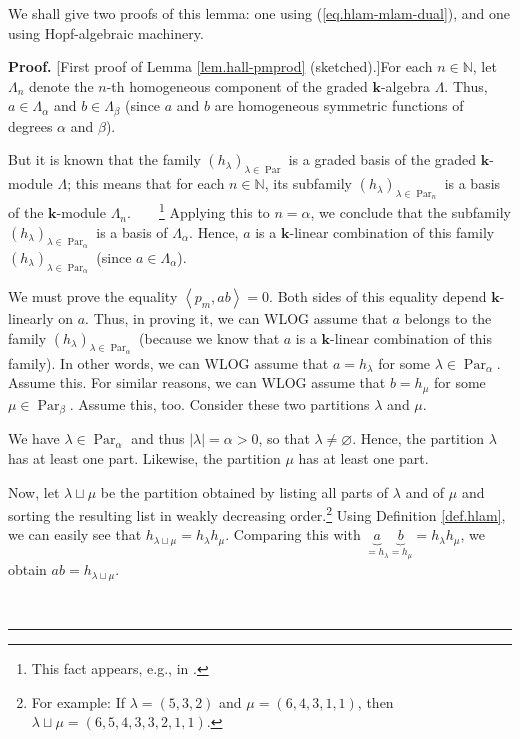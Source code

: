 \documentclass[numbers=enddot,12pt,final,onecolumn,notitlepage]{scrartcl}%
\theoremstyle{definition}
\newenvironment{proof}[1][Proof]{\noindent\textbf{#1.} }{\ \rule{0.5em}{0.5em}}
\newenvironment{verlong}{}{}
\begin{document}
\begin{verlong}
We shall give two proofs of this lemma: one using (\ref{eq.hlam-mlam-dual}),
and one using Hopf-algebraic machinery.

\begin{proof}
[First proof of Lemma \ref{lem.hall-pmprod} (sketched).]For each
$n\in\mathbb{N}$, let $\Lambda_{n}$ denote the $n$-th homogeneous component of
the graded $\mathbf{k}$-algebra $\Lambda$. Thus, $a\in\Lambda_{\alpha}$ and
$b\in\Lambda_{\beta}$ (since $a$ and $b$ are homogeneous symmetric functions
of degrees $\alpha$ and $\beta$).

But it is known that the family $\left(  h_{\lambda}\right)  _{\lambda
\in\operatorname*{Par}}$ is a graded basis of the graded $\mathbf{k}$-module
$\Lambda$; this means that for each $n\in\mathbb{N}$, its subfamily $\left(
h_{\lambda}\right)  _{\lambda\in\operatorname*{Par}\nolimits_{n}}$ is a basis
of the $\mathbf{k}$-module $\Lambda_{n}$.\ \ \ \ \footnote{This fact appears,
e.g., in \cite[Proposition 2.4.3(j)]{GriRei}.} Applying this to $n=\alpha$, we
conclude that the subfamily $\left(  h_{\lambda}\right)  _{\lambda
\in\operatorname*{Par}\nolimits_{\alpha}}$ is a basis of $\Lambda_{\alpha}$.
Hence, $a$ is a $\mathbf{k}$-linear combination of this family $\left(
h_{\lambda}\right)  _{\lambda\in\operatorname*{Par}\nolimits_{\alpha}}$ (since
$a\in\Lambda_{\alpha}$).

We must prove the equality $\left\langle p_{m},ab\right\rangle =0$. Both sides
of this equality depend $\mathbf{k}$-linearly on $a$. Thus, in proving it, we
can WLOG assume that $a$ belongs to the family $\left(  h_{\lambda}\right)
_{\lambda\in\operatorname*{Par}\nolimits_{\alpha}}$ (because we know that $a$
is a $\mathbf{k}$-linear combination of this family). In other words, we can
WLOG assume that $a=h_{\lambda}$ for some $\lambda\in\operatorname*{Par}%
\nolimits_{\alpha}$. Assume this. For similar reasons, we can WLOG assume that
$b=h_{\mu}$ for some $\mu\in\operatorname*{Par}\nolimits_{\beta}$. Assume
this, too. Consider these two partitions $\lambda$ and $\mu$.

We have $\lambda\in\operatorname*{Par}\nolimits_{\alpha}$ and thus $\left\vert
\lambda\right\vert =\alpha>0$, so that $\lambda\neq\varnothing$. Hence, the
partition $\lambda$ has at least one part. Likewise, the partition $\mu$ has
at least one part.

Now, let $\lambda\sqcup\mu$ be the partition obtained by listing all parts of
$\lambda$ and of $\mu$ and sorting the resulting list in weakly decreasing
order.\footnote{For example: If $\lambda=\left(  5,3,2\right)  $ and
$\mu=\left(  6,4,3,1,1\right)  $, then $\lambda\sqcup\mu=\left(
6,5,4,3,3,2,1,1\right)  $.} Using Definition \ref{def.hlam}, we can easily see
that $h_{\lambda\sqcup\mu}=h_{\lambda}h_{\mu}$. Comparing this with
$\underbrace{a}_{=h_{\lambda}}\underbrace{b}_{=h_{\mu}}=h_{\lambda}h_{\mu}$,
we obtain $ab=h_{\lambda\sqcup\mu}$.


\end{proof}
\end{verlong}
\end{document}
